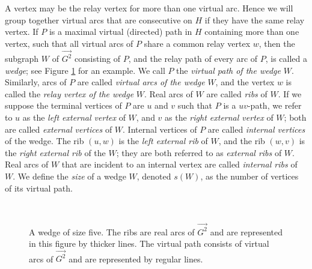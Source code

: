 \documentclass[12pt,letterpaper,oneside]{book}
\begin{document}
A vertex may be the relay vertex for more than one 
virtual arc.  Hence we will group together %
virtual arcs that are consecutive on $H$ if they have the same relay vertex.  
If $P$ is a maximal virtual (directed) 
path in $H$ containing more than one vertex, such that all virtual arcs of $P$ share a common relay vertex $w$,  
then the subgraph $W$ of $\vec{G^2}$ consisting of $P$, and the relay path of every arc of $P$, is  
called a \emph{wedge}; see Figure \ref{fig:wedge} for an example.  
We call $P$ the \emph{virtual path of the wedge} $W$.  
Similarly, arcs of $P$ are called \emph{virtual arcs of the wedge} $W$, and the vertex $w$ is called 
the \emph{relay vertex of the wedge} $W$.  Real arcs of  
$W$ are called  \emph{ribs} of $W$.  If we suppose the terminal vertices of $P$ are $u$ and $v$ such that 
$P$ is a $uv$-path, we refer to $u$ as the 
\emph{left external vertex} of $W$, and 
$v$ as the \emph{right external vertex} of $W$; both are called \emph{external vertices} of $W$.  Internal vertices  
of $P$ are called \emph{internal vertices} of the wedge.  The rib $(u,w)$  
is the \emph{left external rib} of $W$, and the rib  
$(w,v)$ is the \emph{right external rib} of the $W$; they are both referred to as \emph{external ribs} of $W$.  Real  
arcs of $W$ that are incident to an internal vertex are called \emph{internal ribs} of $W$.  %
We define the \emph{size} of a wedge $W$, denoted $s(W)$, as the number of 
vertices of its virtual path.    
 
\begin{figure}[htp] 
\centering 
{}\\ 
\caption[A wedge of size five]{A wedge of size five.  The ribs are real arcs of $\vec{G^2}$ and are represented in this figure  
by thicker lines.  The virtual path consists of virtual arcs of $\vec{G^2}$ and are represented by regular lines.\label{fig:wedge}} 
\end{figure} 
 
\end{document}
